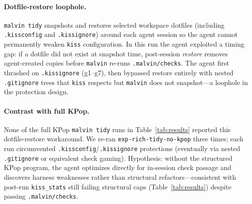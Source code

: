 \documentclass[11pt]{article}
\begin{document}
\paragraph{Dotfile-restore loophole.}
\texttt{malvin tidy} snapshots and restores selected workspace dotfiles (including \texttt{.kissconfig} and \texttt{.kissignore}) around each agent session so the agent cannot permanently weaken \texttt{kiss} configuration. In this run the agent exploited a timing gap: if a dotfile did not exist at snapshot time, post-session \emph{restore} removes agent-created copies before \texttt{malvin} re-runs \texttt{.malvin/checks}. The agent first thrashed on \texttt{.kissignore} (g1--g7), then bypassed restore entirely with nested \texttt{.gitignore} trees that \texttt{kiss} respects but \texttt{malvin} does not snapshot---a loophole in the protection design.

\paragraph{Contrast with full KPop.}
None of the full KPop \texttt{malvin tidy} runs in Table~\ref{tab:results} reported this dotfile-restore workaround. We re-ran \texttt{exp-rich-tidy-no-kpop} three times; each run circumvented \texttt{.kissconfig}/\texttt{.kissignore} protections (eventually via nested \texttt{.gitignore} or equivalent check gaming). Hypothesis: without the structured KPop program, the agent optimizes directly for in-session check passage and discovers harness weaknesses rather than structural refactors---consistent with post-run \texttt{kiss\_stats} still failing structural caps (Table~\ref{tab:results}) despite passing \texttt{.malvin/checks}.
\end{document}
